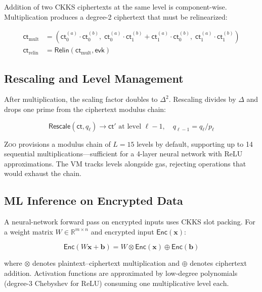 \documentclass[11pt,letterpaper]{article}
\theoremstyle{definition}
\theoremstyle{remark}
\newcommand{\Zoo}{\textsc{Zoo}}
\newcommand{\CKKS}{\textsc{CKKS}}
\begin{document}
Addition of two \CKKS{} ciphertexts at the same level is component-wise. Multiplication produces a degree-2 ciphertext that must be relinearized:

\begin{align}
  \mathsf{ct}_{\mathrm{mult}} &= (\mathsf{ct}_0^{(a)} \cdot \mathsf{ct}_0^{(b)},\; \mathsf{ct}_0^{(a)} \cdot \mathsf{ct}_1^{(b)} + \mathsf{ct}_1^{(a)} \cdot \mathsf{ct}_0^{(b)},\; \mathsf{ct}_1^{(a)} \cdot \mathsf{ct}_1^{(b)}) \\
  \mathsf{ct}_{\mathrm{relin}} &= \mathsf{Relin}(\mathsf{ct}_{\mathrm{mult}}, \mathsf{evk})
\end{align}

\subsection{Rescaling and Level Management}

After multiplication, the scaling factor doubles to $\Delta^2$. Rescaling divides by $\Delta$ and drops one prime from the ciphertext modulus chain:

\begin{equation}
  \mathsf{Rescale}(\mathsf{ct}, q_\ell) \to \mathsf{ct}' \text{ at level } \ell - 1, \quad q_{\ell-1} = q_\ell / p_\ell
\end{equation}

\Zoo{} provisions a modulus chain of $L = 15$ levels by default, supporting up to 14 sequential multiplications---sufficient for a 4-layer neural network with ReLU approximations. The VM tracks levels alongside gas, rejecting operations that would exhaust the chain.

\subsection{ML Inference on Encrypted Data}

A neural-network forward pass on encrypted inputs uses \CKKS{} slot packing. For a weight matrix $W \in \mathbb{R}^{m \times n}$ and encrypted input $\mathsf{Enc}(\mathbf{x})$:

\begin{equation}
  \mathsf{Enc}(W\mathbf{x} + \mathbf{b}) = W \otimes \mathsf{Enc}(\mathbf{x}) \oplus \mathsf{Enc}(\mathbf{b})
\end{equation}

\noindent where $\otimes$ denotes plaintext--ciphertext multiplication and $\oplus$ denotes ciphertext addition. Activation functions are approximated by low-degree polynomials (degree-3 Chebyshev for ReLU) consuming one multiplicative level each.
\end{document}
